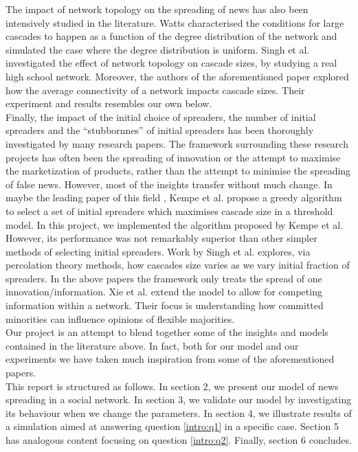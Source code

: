 \documentclass[10pt]{article}
\begin{document}
The impact of network topology on the spreading of news has also been intensively studied in the literature. Watts characterised the conditions for large cascades to happen as a function of the degree distribution of the network \cite{watts2002simple} and simulated the case where the degree distribution is uniform. Singh et al. \cite{singh2013threshold} investigated the effect of network topology on cascade sizes, by studying a real high school network. Moreover, the authors of the aforementioned paper explored how the average connectivity of a network impacts cascade sizes. Their experiment and results resembles our own below.\\  

Finally, the impact of the initial choice of spreaders, the number of initial spreaders and the ``stubbornnes'' of initial spreaders has been thoroughly investigated by many research papers. The framework surrounding these research projects has often been the spreading of innovation or the attempt to maximise the marketization of products, rather than the attempt to minimise the spreading of false news. However, most of the insights transfer without much change. In maybe the leading paper of this field \cite{kempe2003maximizing}, Kempe et al. propose a greedy algorithm to select a set of initial spreaders which maximises cascade size in a threshold model. In this project, we implemented the algorithm proposed by Kempe et al. However, its performance was not remarkably superior than other simpler methods of selecting initial spreaders. Work by Singh et al. \cite{singh2013threshold} explores, via percolation theory methods, how cascades size varies as we vary initial fraction of spreaders. In the above papers the framework only treats the spread of one innovation/information. Xie et al. \cite{xie2012evolution} extend the model to allow for competing information within a network. Their focus is understanding how committed minorities can influence opinions of flexible majorities. \\

Our project is an attempt to blend together some of the insights and models contained in the literature above. In fact, both for our model and our experiments we have taken much inspiration from some of the aforementioned papers. \\

This report is structured as follows. In section 2, we present our model of news spreading in a social network. In section 3, we validate our model by investigating its behaviour when we change the parameters. In section 4, we illustrate results of a simulation aimed at answering question \eqref{intro:q1} in a specific case. Section 5 has analogous content focusing on question \eqref{intro:q2}. Finally, section 6 concludes.
\end{document}
